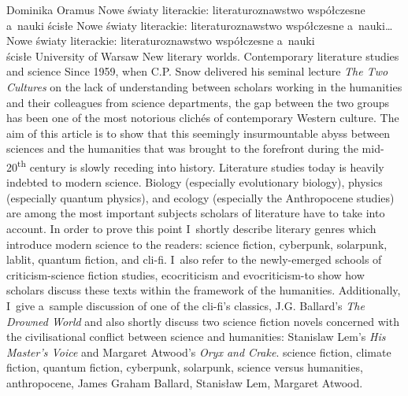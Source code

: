 \begin{artplenv}{Dominika Oramus}
	{Nowe światy literackie: literaturoznawstwo współczesne a~nauki ścisłe}
	{Nowe światy literackie: literaturoznawstwo współczesne a~nauki\ldots}
	{Nowe światy literackie: literaturoznawstwo współczesne a~nauki\\ścisłe}
	{University of Warsaw}
	{New literary worlds. Contemporary literature studies and science}
	{Since 1959, when C.P. Snow delivered his seminal lecture \textit{The Two Cultures} on the lack of understanding between scholars working in the humanities and their colleagues from science departments, the gap between the two groups has been one of the most notorious clichés of contemporary Western culture. The aim of this article is to show that this seemingly insurmountable abyss between sciences and the humanities that was brought to the forefront during the mid-20\textsuperscript{th} century is slowly receding into history. Literature studies today is heavily indebted to modern science. Biology (especially evolutionary biology), physics (especially quantum physics), and ecology (especially the Anthropocene studies) are among the most important subjects scholars of literature have to take into account. In order to prove this point I~shortly describe literary genres which introduce modern science to the readers: science fiction, cyberpunk, solarpunk, lablit, quantum fiction, and cli-fi. I~also refer to the newly-emerged schools of criticism-science fiction studies, ecocriticism and evocriticism-to show how scholars discuss these texts within the framework of the humanities. Additionally, I~give a~sample discussion of one of the cli-fi's classics, J.G. Ballard’s \textit{The Drowned World} and also shortly discuss two science fiction novels concerned with the civilisational conflict between science and humanities: Stanislaw Lem's \textit{His Master's Voice} and Margaret Atwood's \textit{Oryx and Crake}.}
	{science fiction, climate fiction, quantum fiction, cyberpunk, solarpunk, science versus humanities, anthropocene, James Graham Ballard, Stanisław Lem, Margaret Atwood.}





\end{artplenv}
